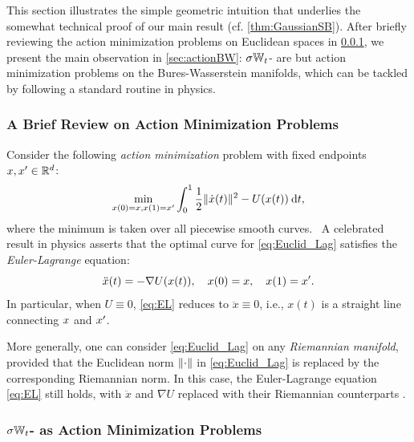 This section illustrates the simple geometric intuition that underlies the somewhat technical proof of our main result (cf. \cref{thm:GaussianSB}). After briefly reviewing the action minimization problems on Euclidean spaces in \cref{sec:actionRd}, we present the main observation in \cref{sec:actionBW}: $\sigma\mathbb{W}_{t}$- are but action minimization problems on the Bures-Wasserstein manifolds, which can be tackled by following a standard routine in physics. 

 
\subsubsection{A Brief Review on Action Minimization Problems}%
\label{sec:actionRd}

Consider the following \emph{action minimization} problem with fixed endpoints $x, x' \in \mathbb{R}^d$:
\begin{align}
\label{eq:Euclid_Lag}
\min_{x(0) = x, x(1) = x'} \int_0^1 {\frac{1}{2} \lVert\dot{x}(t)\rVert^2 - U(x(t)) } \:\mathrm{d} t,
\end{align}
where the minimum is taken over all piecewise smooth curves. 
~A celebrated result in physics asserts that the optimal curve for \eqref{eq:Euclid_Lag} satisfies the \emph{Euler-Lagrange} equation:
\begin{equation}
\label{eq:EL}
\ddot{x}(t) = -\nabla U(x(t)), \quad x(0) = x,\quad x(1) = x'.
\end{equation}
In particular, when $U \equiv0$, \eqref{eq:EL} reduces to $\ddot{x} \equiv 0$, i.e., $x(t)$ is a straight line connecting $x$ and $x'$.

More generally, one can consider \eqref{eq:Euclid_Lag} on any \emph{Riemannian manifold}, provided that the Euclidean norm $\lVert\cdot\rVert$ in \eqref{eq:Euclid_Lag} is replaced by the corresponding Riemannian norm. In this case, the Euler-Lagrange equation \eqref{eq:EL} still holds, with $\ddot{x}$ and $\nabla U$ replaced with their Riemannian counterparts \citep{villani2009optimal}.

\subsubsection{$\sigma\mathbb{W}_{t}$- as Action Minimization Problems}

